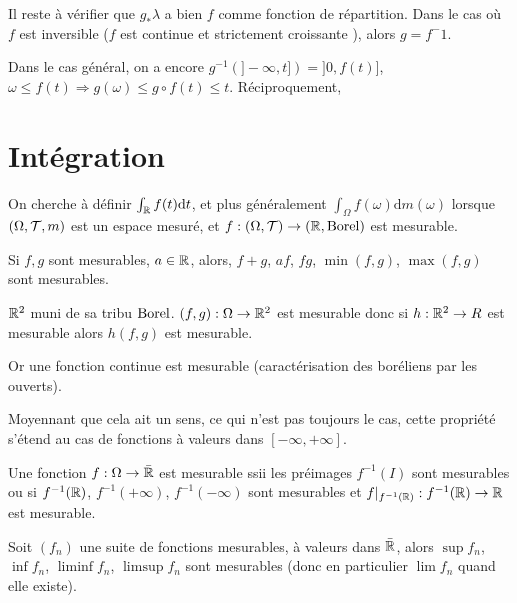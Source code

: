 \documentclass[10pt,a4paper,notitlepage ]{report}
\begin{document}
Il reste à vérifier que $g_*  \lambda$ a bien $f$ comme fonction de répartition. Dans le cas où $f$ est inversible ($f$ est continue et strictement croissante ), alors $g = f^-1$.

Dans le cas général, on a encore $g^{-1}(]-\infty, t]) = ]0,f(t)]$, $\omega \le f(t) \Rightarrow g(\omega) \le g \circ f(t) \le t$. Réciproquement, 

\section{Intégration}

On cherche à définir $\int_\mathbb R f(t)\mathrm dt$, et plus généralement $\int_\Omega f(\omega)\mathrm dm(\omega)$ lorsque $(\Omega,\mathcal T, m)$ est un espace mesuré, et $f:(\Omega,\mathcal T)\rightarrow(\mathbb R,\mathrm{Borel})$ est mesurable.

\begin{propriete}
	Si $f, g$ sont mesurables, $a\in\mathbb R$, alors, $f+g$, $af$, $fg$, $\min(f,g)$, $\max(f,g)$ sont mesurables.
\end{propriete}

\begin{demo}
	$\mathbb R^2$ muni de sa tribu $\mathrm{Borel}$. $(f,g) : \Omega \rightarrow \mathbb R^2$ est mesurable donc si $h:\mathbb R^2 \rightarrow R$ est mesurable alors $h(f,g)$ est mesurable.
	
	Or une fonction continue est mesurable (caractérisation des boréliens par les ouverts).
\end{demo}

\begin{rem}
	Moyennant que cela ait un sens, ce qui n'est pas toujours le cas, cette propriété s'étend au cas de fonctions à valeurs dans $[-\infty,+\infty]$.
\end{rem}

\begin{rem}
	Une fonction $f : \Omega \rightarrow \bar{\mathbb R}$ est mesurable ssii les préimages $f^{-1}(I)$ sont mesurables ou si $f^{-1}(\mathbb R)$, $f^{-1}(+\infty)$, $f^{-1}(-\infty)$ sont mesurables et $f|_{f^{-1}(\mathbb R)} : f^{-1}(\mathbb R)\rightarrow \mathbb R$ est mesurable.
\end{rem}

\begin{propriete}
	Soit $(f_n)$ une suite de fonctions mesurables, à valeurs dans $\bar{\mathbb R}$, alors $\sup f_n$, $\inf f_n$, $\liminf f_n$, $\limsup f_n$ sont mesurables (donc en particulier $\lim f_n$ quand elle existe).
\end{propriete}
\end{document}
